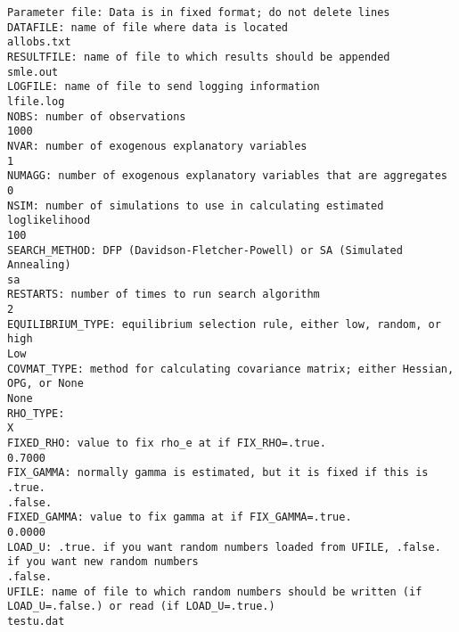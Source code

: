 \documentclass{article}
\begin{document}
{\scriptsize \begin{verbatim}
Parameter file: Data is in fixed format; do not delete lines
DATAFILE: name of file where data is located
allobs.txt
RESULTFILE: name of file to which results should be appended
smle.out
LOGFILE: name of file to send logging information
lfile.log
NOBS: number of observations
1000
NVAR: number of exogenous explanatory variables
1
NUMAGG: number of exogenous explanatory variables that are aggregates
0
NSIM: number of simulations to use in calculating estimated loglikelihood
100
SEARCH_METHOD: DFP (Davidson-Fletcher-Powell) or SA (Simulated Annealing)
sa
RESTARTS: number of times to run search algorithm
2
EQUILIBRIUM_TYPE: equilibrium selection rule, either low, random, or high
Low
COVMAT_TYPE: method for calculating covariance matrix; either Hessian, OPG, or None
None
RHO_TYPE: 
X
FIXED_RHO: value to fix rho_e at if FIX_RHO=.true.
0.7000
FIX_GAMMA: normally gamma is estimated, but it is fixed if this is .true.
.false.
FIXED_GAMMA: value to fix gamma at if FIX_GAMMA=.true.
0.0000
LOAD_U: .true. if you want random numbers loaded from UFILE, .false. if you want new random numbers
.false.
UFILE: name of file to which random numbers should be written (if LOAD_U=.false.) or read (if LOAD_U=.true.)
testu.dat
\end{verbatim}}
\end{document}
